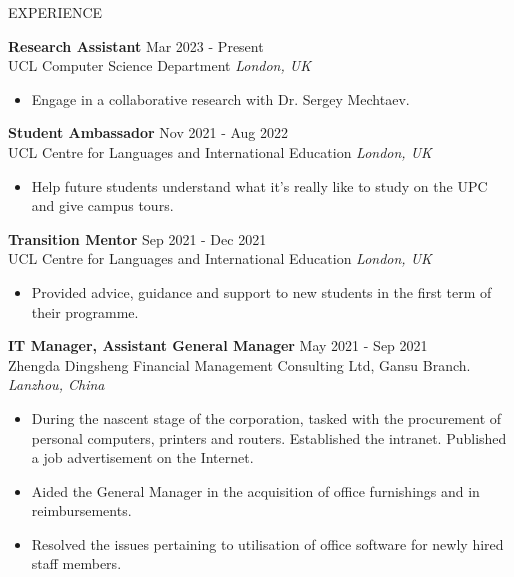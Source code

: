 \documentclass{resume} %
\begin{document}
\begin{rSection}{EXPERIENCE}

\textbf{Research Assistant} \hfill Mar 2023 - Present\\
UCL Computer Science Department \hfill \textit{London, UK}
\begin{itemize}
    \itemsep -3pt {} 
    \item Engage in a collaborative research with Dr. Sergey Mechtaev.
\end{itemize}

\textbf{Student Ambassador} \hfill Nov 2021 - Aug 2022\\
UCL Centre for Languages and International Education \hfill \textit{London, UK}
\begin{itemize}
    \itemsep -3pt {} 
    \item Help future students understand what it's really like to study on the UPC and give campus tours.
\end{itemize}

\textbf{Transition Mentor} \hfill Sep 2021 - Dec 2021\\
UCL Centre for Languages and International Education \hfill \textit{London, UK}
\begin{itemize}
    \itemsep -3pt {} 
    \item Provided advice, guidance and support to new students in the first term of their programme.
\end{itemize}
 
\textbf{IT Manager, Assistant General Manager} \hfill May 2021 - Sep 2021\\
Zhengda Dingsheng Financial Management Consulting Ltd, Gansu Branch. \hfill \textit{Lanzhou, China}
\begin{itemize}
    \itemsep -3pt {} 
    \item During the nascent stage of the corporation, tasked with the procurement of personal computers, printers and routers. Established the intranet. Published a job advertisement on the Internet.
    \item Aided the General Manager in the acquisition of office furnishings and in reimbursements.
    \item Resolved the issues pertaining to utilisation of office software for newly hired staff members.
\end{itemize}

\end{rSection} 
\end{document}
